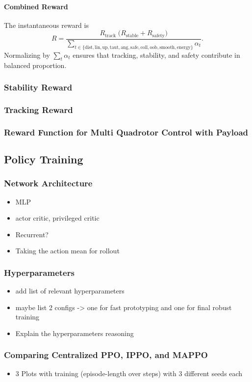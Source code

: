 \paragraph{Combined Reward}
The instantaneous reward is
\[
R 
= \frac{\,R_{\mathrm{track}}\;\bigl(R_{\mathrm{stable}} + R_{\mathrm{safety}}\bigr)\,}
{\displaystyle \sum_{t\in\{\mathrm{dist},\mathrm{lin},\mathrm{up},\mathrm{taut},\mathrm{ang},\mathrm{safe},\mathrm{coll},\mathrm{oob},\mathrm{smooth},\mathrm{energy}\}} \alpha_t}.
\]
Normalizing by $\sum_t \alpha_t$ ensures that tracking, stability, and safety contribute in balanced proportion.
\subsubsection{Stability Reward}
\subsubsection{Tracking Reward}
\subsubsection{Reward Function for Multi Quadrotor Control with Payload}

\subsection{Policy Training}
\subsubsection{Network Architecture}
\begin{itemize}
    \item MLP
    \item actor critic, privileged critic
    \item Recurrent?
    \item Taking the action mean for rollout
\end{itemize}
\subsubsection{Hyperparameters}
\begin{itemize}
    \item add list of relevant hyperparameters
    \item maybe list 2 configs -> one for fast prototyping and one for final robust training
    \item Explain the hyperparameters reasoning
\end{itemize}
\subsubsection{Comparing Centralized PPO, IPPO, and MAPPO}

\begin{itemize}
    \item 3 Plots with training (episode-length over steps) with 3 different seeds each
\end{itemize}


